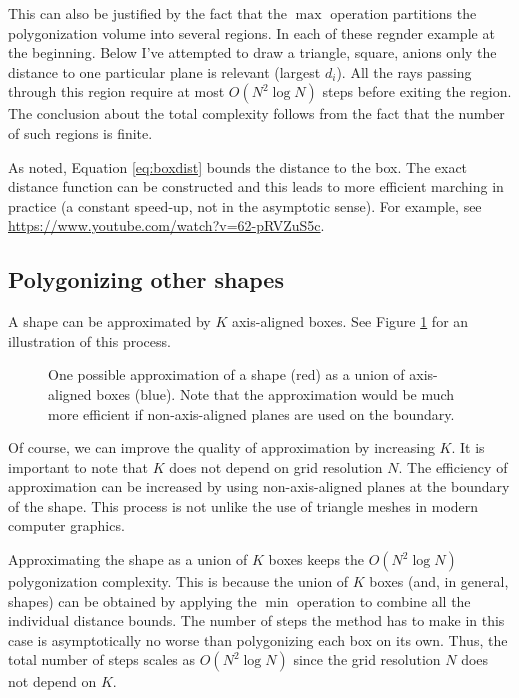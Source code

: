 \documentclass[11pt,twocolumn]{article}
\begin{document}
			This can also be justified by the fact that the $\max$ operation partitions the polygonization volume into several regions.
			In each of these regnder example at the beginning. Below I’ve attempted to draw a triangle, square, anions only the distance to one particular plane is relevant (largest $d_i$).
			All the rays passing through this region require at most $O(N^2\log N)$ steps before exiting the region.
			The conclusion about the total complexity follows from the fact that the number of such regions is finite.

			As noted, Equation \eqref{eq:boxdist} bounds the distance to the box.
			The exact distance function can be constructed and this leads to more efficient marching in practice
			(a constant speed-up, not in the asymptotic sense).
			For example, see \url{https://www.youtube.com/watch?v=62-pRVZuS5c}.

		\subsection{Polygonizing other shapes}
			A shape can be approximated by $K$ axis-aligned boxes.
			See Figure \ref{fig:boxapprox} for an illustration of this process.
			\begin{figure}
				\centering
				\resizebox{0.5\textwidth}{!}
				{
					
				}
				\caption
				{
					One possible approximation of a shape (red) as a union of axis-aligned boxes (blue).
					Note that the approximation would be much more efficient if non-axis-aligned planes are used on the boundary.
				}
				\label{fig:boxapprox}
			\end{figure}
			Of course, we can improve the quality of approximation by increasing $K$.
			It is important to note that $K$ does not depend on grid resolution $N$.
			The efficiency of approximation can be increased by using non-axis-aligned planes at the boundary of the shape.
			This process is not unlike the use of triangle meshes in modern computer graphics.

			Approximating the shape as a union of $K$ boxes keeps the $O(N^2\log N)$ polygonization complexity.
			This is because the union of $K$ boxes (and, in general, shapes) can be obtained by applying the $\min$ operation to combine all the individual distance bounds.
			The number of steps the method has to make in this case is asymptotically no worse than polygonizing each box on its own.
			Thus, the total number of steps scales as $O(N^2\log N)$ since the grid resolution $N$ does not depend on $K$.
\end{document}
